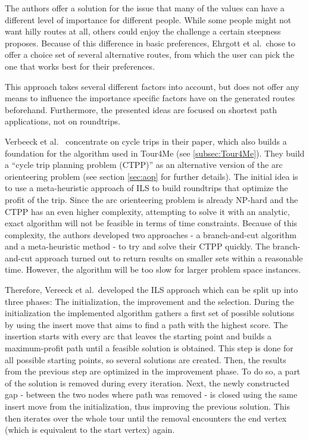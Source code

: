 The authors offer a solution for the issue that many of the values can have a different level of importance for different people. 
While some people might not want hilly routes at all, others could enjoy the challenge a certain steepness proposes. 
Because of this difference in basic preferences, Ehrgott et al.\ chose to offer a choice set of several alternative routes, from which the user can pick the one that works best for their preferences. 

This approach takes several different factors into account, but does not offer any means to influence the importance specific factors have on the generated routes beforehand.
Furthermore, the presented ideas are focused on shortest path applications, not on roundtrips.

Verbeeck et al.\ \cite{verbeeck_extension_2014} concentrate on cycle trips in their paper, which also builds a foundation for the algorithm used in Tour4Me (see \ref{subsec:Tour4Me}). 
They build a \enquote{cycle trip planning problem (CTPP)} as an alternative version of the arc orienteering problem (see section \ref{sec:aop} for further details). 
The initial idea is to use a meta-heuristic approach of ILS to build roundtrips that optimize the profit of the trip.
Since the arc orienteering problem is already NP-hard and the CTPP has an even higher complexity, attempting to solve it with an analytic, exact algorithm will not be feasible in terms of time constraints. 
Because of this complexity, the authors developed two approaches - a branch-and-cut algorithm and a meta-heuristic method - to try and solve their CTPP quickly. 
The branch-and-cut approach turned out to return results on smaller sets within a reasonable time.
However, the algorithm will be too slow for larger problem space instances.

Therefore, Vereeck et al.\ developed the ILS approach which can be split up into three phases:
The initialization, the improvement and the selection.
During the initialization the implemented algorithm gathers a first set of possible solutions by using the insert move that aims to find a path with the highest score.
The insertion starts with every arc that leaves the starting point and builds a maximum-profit path until a feasible solution is obtained.
This step is done for all possible starting points, so several solutions are created.
Then, the results from the previous step are optimized in the improvement phase. 
To do so, a part of the solution is removed during every iteration.
Next, the newly constructed gap - between the two nodes where path was removed - is closed using the same insert move from the initialization, thus improving the previous solution.
This then iterates over the whole tour until the removal encounters the end vertex (which is equivalent to the start vertex) again.

